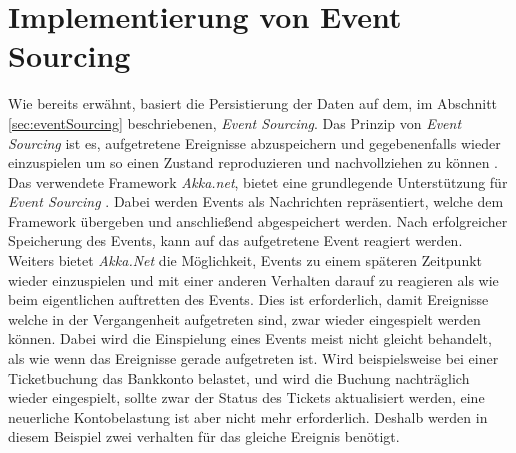 \section{Implementierung von Event Sourcing}
\label{sec:implementation:eventSouring}
Wie bereits erwähnt, basiert die Persistierung der Daten auf dem, im Abschnitt \ref{sec:eventSourcing} beschriebenen, \textit{Event Sourcing}. Das Prinzip von \textit{Event Sourcing} ist es, aufgetretene Ereignisse abzuspeichern und gegebenenfalls wieder einzuspielen um so einen Zustand reproduzieren und nachvollziehen zu können \citep{betts2013CQRSEventSourcing}. \\
Das verwendete Framework \textit{Akka.net}, bietet eine grundlegende Unterstützung für \textit{Event Sourcing} \citep{Akka.netCommunityAkka.NETDocumentation}. Dabei werden Events als Nachrichten repräsentiert, welche dem Framework übergeben und anschließend abgespeichert werden. Nach erfolgreicher Speicherung des Events, kann auf das aufgetretene Event reagiert werden. Weiters bietet \textit{Akka.Net} die Möglichkeit, Events zu einem späteren Zeitpunkt wieder einzuspielen und mit einer anderen Verhalten darauf zu reagieren als wie beim eigentlichen auftretten des Events. Dies ist erforderlich, damit Ereignisse welche in der Vergangenheit aufgetreten sind, zwar wieder eingespielt werden können. Dabei wird die Einspielung eines Events meist nicht gleicht behandelt, als wie wenn das Ereignisse gerade aufgetreten ist. Wird beispielsweise bei einer Ticketbuchung das Bankkonto belastet, und wird die Buchung nachträglich wieder eingespielt, sollte zwar der Status des Tickets aktualisiert werden, eine neuerliche Kontobelastung ist aber nicht mehr erforderlich. Deshalb werden in diesem Beispiel zwei verhalten für das gleiche Ereignis benötigt.

